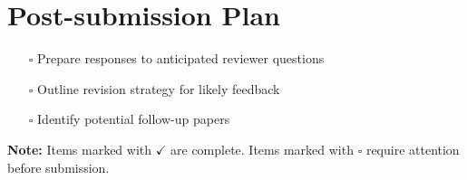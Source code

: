 \documentclass[11pt,letterpaper]{article}
\begin{document}
\section*{Post-submission Plan}

\begin{itemize}[leftmargin=*]
\item[$\square$] Prepare responses to anticipated reviewer questions
\item[$\square$] Outline revision strategy for likely feedback
\item[$\square$] Identify potential follow-up papers
\end{itemize}

\vspace{0.5cm}
\textbf{Note:} Items marked with $\checkmark$ are complete. Items marked with $\square$ require attention before submission.
\end{document}
